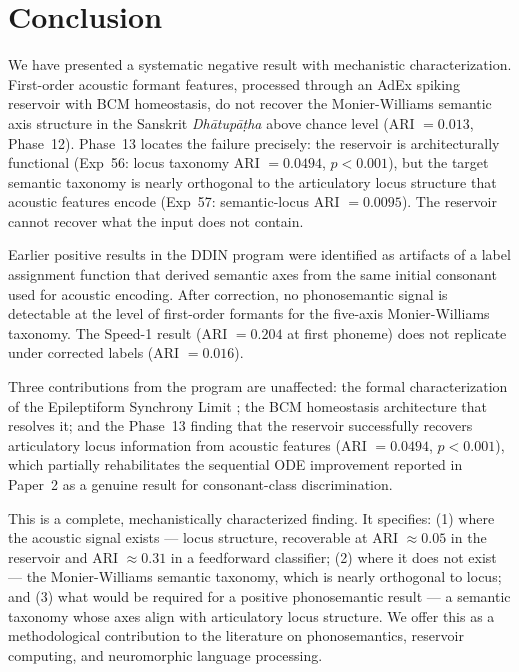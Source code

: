 \documentclass{article}
\begin{document}
\section{Conclusion}

We have presented a systematic negative result with mechanistic
characterization. First-order acoustic formant features, processed through
an AdEx spiking reservoir with BCM homeostasis, do not recover the
Monier-Williams semantic axis structure in the Sanskrit
\textit{Dhātupāṭha} above chance level (ARI $= 0.013$, Phase~12).
Phase~13 locates the failure precisely: the reservoir is architecturally
functional (Exp~56: locus taxonomy ARI $= 0.0494$, $p < 0.001$), but
the target semantic taxonomy is nearly orthogonal to the articulatory
locus structure that acoustic features encode (Exp~57: semantic-locus
ARI $= 0.0095$). The reservoir cannot recover what the input does not
contain.

Earlier positive results in the DDIN program were identified as artifacts
of a label assignment function that derived semantic axes from the same
initial consonant used for acoustic encoding. After correction, no
phonosemantic signal is detectable at the level of first-order formants
for the five-axis Monier-Williams taxonomy. The Speed-1 result
(ARI $= 0.204$ at first phoneme) does not replicate under corrected
labels (ARI $= 0.016$).

Three contributions from the program are unaffected: the formal
characterization of the Epileptiform Synchrony Limit
\citep{kumar2026esl}; the BCM homeostasis architecture that resolves it;
and the Phase~13 finding that the reservoir successfully recovers
articulatory locus information from acoustic features (ARI $= 0.0494$,
$p < 0.001$), which partially rehabilitates the sequential ODE
improvement reported in Paper~2 as a genuine result for consonant-class
discrimination.

This is a complete, mechanistically characterized finding. It specifies:
(1) where the acoustic signal exists --- locus structure, recoverable at
ARI $\approx 0.05$ in the reservoir and ARI $\approx 0.31$ in a
feedforward classifier; (2) where it does not exist --- the
Monier-Williams semantic taxonomy, which is nearly orthogonal to locus;
and (3) what would be required for a positive phonosemantic result --- a
semantic taxonomy whose axes align with articulatory locus structure. We
offer this as a methodological contribution to the literature on
phonosemantics, reservoir computing, and neuromorphic language
processing.
\end{document}
